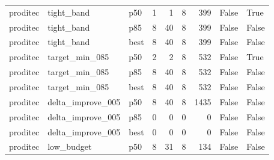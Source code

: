\begin{tabular}{lllrrrrll}
proditec &           tight\_band &    p50 &                   1 &                 1 &                    8 &                          399 &                                        False &                                 True \\
proditec &           tight\_band &    p85 &                   8 &                40 &                    8 &                          399 &                                        False &                                False \\
proditec &           tight\_band &   best &                   8 &                40 &                    8 &                          399 &                                        False &                                False \\
proditec &       target\_min\_085 &    p50 &                   2 &                 2 &                    8 &                          532 &                                        False &                                 True \\
proditec &       target\_min\_085 &    p85 &                   8 &                40 &                    8 &                          532 &                                        False &                                False \\
proditec &       target\_min\_085 &   best &                   8 &                40 &                    8 &                          532 &                                        False &                                False \\
proditec &    delta\_improve\_005 &    p50 &                   8 &                40 &                    8 &                         1435 &                                        False &                                False \\
proditec &    delta\_improve\_005 &    p85 &                   0 &                 0 &                    0 &                            0 &                                        False &                                False \\
proditec &    delta\_improve\_005 &   best &                   0 &                 0 &                    0 &                            0 &                                        False &                                False \\
proditec &           low\_budget &    p50 &                   8 &                31 &                    8 &                          134 &                                        False &                                False \\

\end{tabular}
